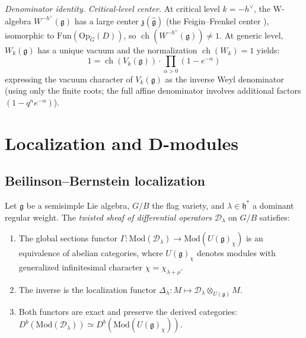 \begin{calculation}
\emph{Denominator identity.}
\emph{Critical-level center.}
At critical level $k = -h^\vee$, the W-algebra $W^{-h^\vee}(\mathfrak{g})$ has a large center $\mathfrak{z}(\widehat{\mathfrak{g}})$ (the Feigin--Frenkel center \cite{Feigin-Frenkel}), isomorphic to $\mathrm{Fun}(\mathrm{Op}_{\check{G}}(D))$, so $\operatorname{ch}(W^{-h^\vee}(\mathfrak{g})) \neq 1$. At generic level, $W_k(\mathfrak{g})$ has a unique vacuum and the normalization $\operatorname{ch}(W_k) = 1$ yields:
\[
1 = \operatorname{ch}(V_k(\mathfrak{g})) \cdot
\prod_{\alpha > 0}(1 - e^{-\alpha})
\]
expressing the vacuum character of $V_k(\mathfrak{g})$ as the inverse Weyl denominator (using only the finite roots; the full affine denominator involves additional factors $(1 - q^n e^{-\alpha})$).
\end{calculation}

\section{Localization and D-modules}\label{sec:localization}

\subsection{Beilinson--Bernstein localization}

\begin{theorem}
\label{thm:beilinson-bernstein}
Let $\mathfrak{g}$ be a semisimple Lie algebra, $G/B$ the flag variety,
and $\lambda \in \mathfrak{h}^*$ a dominant regular weight. The
\emph{twisted sheaf of differential operators}
$\mathcal{D}_\lambda$ on $G/B$ satisfies:
\begin{enumerate}[label=\textup{(\roman*)}]
\item The global sections functor $\Gamma: \mathrm{Mod}(\mathcal{D}_\lambda)
 \to \mathrm{Mod}(U(\mathfrak{g})_\chi)$ is an equivalence
 of abelian categories, where $U(\mathfrak{g})_\chi$ denotes
 modules with generalized infinitesimal character
 $\chi = \chi_{\lambda+\rho}$.
\item The inverse is the localization functor
 $\Delta_\lambda: M \mapsto \mathcal{D}_\lambda \otimes_{U(\mathfrak{g})} M$.
\item Both functors are exact and preserve the derived categories:
 $D^b(\mathrm{Mod}(\mathcal{D}_\lambda))
 \simeq D^b(\mathrm{Mod}(U(\mathfrak{g})_\chi))$.
\end{enumerate}
\end{theorem}

